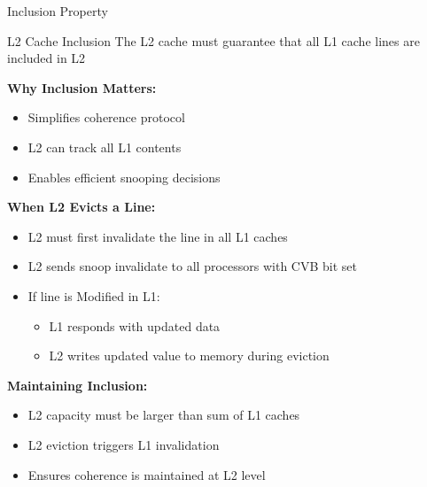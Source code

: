 \documentclass[aspectratio=169,12pt]{beamer}
\begin{document}
\begin{frame}{Inclusion Property}
\begin{alertblock}{L2 Cache Inclusion}
The L2 cache must guarantee that all L1 cache lines are included in L2
\end{alertblock}

\vspace{0.5em}
\textbf{Why Inclusion Matters:}
\begin{itemize}
\item Simplifies coherence protocol
\item L2 can track all L1 contents
\item Enables efficient snooping decisions
\end{itemize}

\vspace{0.5em}
\textbf{When L2 Evicts a Line:}
\begin{itemize}
\item L2 must first invalidate the line in all L1 caches
\item L2 sends snoop invalidate to all processors with CVB bit set
\item If line is Modified in L1:
    \begin{itemize}
    \item L1 responds with updated data
    \item L2 writes updated value to memory during eviction
    \end{itemize}
\end{itemize}

\vspace{0.5em}
\textbf{Maintaining Inclusion:}
\begin{itemize}
\item L2 capacity must be larger than sum of L1 caches
\item L2 eviction triggers L1 invalidation
\item Ensures coherence is maintained at L2 level
\end{itemize}
\end{frame}
\end{document}
